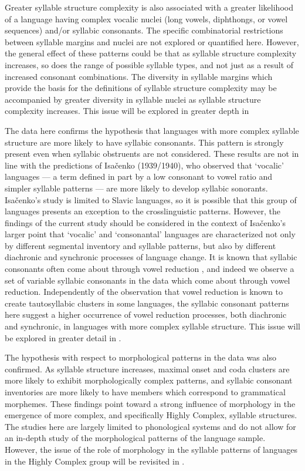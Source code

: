   Greater syllable structure complexity is also associated with a greater likelihood of a language having complex vocalic nuclei (long vowels, diphthongs, or vowel sequences) and/or syllabic consonants. The specific combinatorial restrictions between syllable margins and nuclei are not explored or quantified here. However, the general effect of these patterns could be that as syllable structure complexity increases, so does the range of possible syllable types, and not just as a result of increased consonant combinations. The diversity in syllable margins which provide the basis for the definitions of syllable structure complexity may be accompanied by greater diversity in syllable nuclei as syllable structure complexity increases. This issue will be explored in greater depth in 

  The data here confirms the hypothesis that languages with more complex syllable structure are more likely to have syllabic consonants. This pattern is strongly present even when syllabic obstruents are not considered. These results are not in line with the predictions of Isačenko (1939/1940), who observed that ‘vocalic’ languages — a term defined in part by a low consonant to vowel ratio and simpler syllable patterns — are more likely to develop syllabic sonorants. Isačenko’s study is limited to Slavic languages, so it is possible that this group of languages presents an exception to the crosslinguistic patterns. However, the findings of the current study should be considered in the context of Isačenko’s larger point that ‘vocalic’ and ‘consonantal’ languages are characterized not only by different segmental inventory and syllable patterns, but also by different diachronic and synchronic processes of language change. It is known that syllabic consonants often come about through vowel reduction \citep{Bell1978a}, and indeed we observe a set of variable syllabic consonants in the data which come about through vowel reduction. Independently of the observation that vowel reduction is known to create tautosyllabic clusters in some languages, the syllabic consonant patterns here suggest a higher occurrence of vowel reduction processes, both diachronic and synchronic, in languages with more complex syllable structure. This issue will be explored in greater detail in .

  The hypothesis with respect to morphological patterns in the data was also confirmed. As syllable structure increases, maximal onset and coda clusters are more likely to exhibit morphologically complex patterns, and syllabic consonant inventories are more likely to have members which correspond to grammatical morphemes. These findings point toward a strong influence of morphology in the emergence of more complex, and specifically Highly Complex, syllable structures. The studies here are largely limited to phonological systems and do not allow for an in-depth study of the morphological patterns of the language sample. However, the issue of the role of morphology in the syllable patterns of languages in the Highly Complex group will be revisited in .

